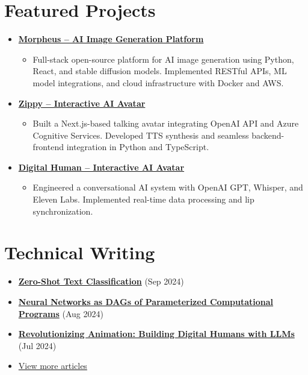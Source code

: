 \documentclass[letterpaper,11pt]{article}
\newcommand{\normalfaExternalLink}{{\mdseries\faExternalLink}}
\begin{document}
\section{Featured Projects}
\begin{itemize}[leftmargin=*, itemsep=1pt]
    \item \textbf{\href{https://github.com/Monadical-SAS/Morpheus}{Morpheus -- AI Image Generation Platform \normalfaExternalLink}}
    \begin{itemize}[itemsep=0pt]
        \item Full-stack open-source platform for AI image generation using Python, React, and stable diffusion models. Implemented RESTful APIs, ML model integrations, and cloud infrastructure with Docker and AWS.
    \end{itemize}
    \item \textbf{\href{https://github.com/asanchezyali/ai-avatar}{Zippy -- Interactive AI Avatar \normalfaExternalLink}}
    \begin{itemize}[itemsep=0pt]
        \item Built a Next.js-based talking avatar integrating OpenAI API and Azure Cognitive Services. Developed TTS synthesis and seamless backend-frontend integration in Python and TypeScript.
    \end{itemize}
    \item \textbf{\href{https://github.com/asanchezyali/talking-avatar-with-ai}{Digital Human -- Interactive AI Avatar \normalfaExternalLink}}
    \begin{itemize}[itemsep=0pt]
        \item Engineered a conversational AI system with OpenAI GPT, Whisper, and Eleven Labs. Implemented real-time data processing and lip synchronization.
    \end{itemize}
\end{itemize}

\section{Technical Writing}
\begin{itemize}[leftmargin=*, itemsep=0pt]
    \item \textbf{\href{https://www.asanchezyali.com/blog/en/ai/20240917ZeroShot}{Zero-Shot Text Classification}} (Sep 2024)
    \item \textbf{\href{https://www.asanchezyali.com/blog/en/differentiable-programming/20240923DifferentiablePrograms}{Neural Networks as DAGs of Parameterized Computational Programs}} (Aug 2024)
    \item \textbf{\href{https://www.asanchezyali.com/blog/en/ai-avatars/20240703DigitalHuman}{Revolutionizing Animation: Building Digital Humans with LLMs}} (Jul 2024)
    \item \href{https://www.asanchezyali.com/}{View more articles \normalfaExternalLink}
\end{itemize}
\end{document}
